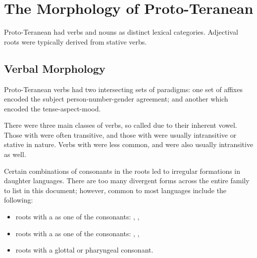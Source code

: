 \documentclass[grammar]{subfiles}
\begin{document}


\section{The Morphology of Proto-Teranean}
\label{sec:history:proto_teranean:morphology}

Proto-Teranean had verbs and nouns as distinct lexical categories.  Adjectival
roots were typically derived from stative verbs.


\subsection{Verbal Morphology}
\label{ssec:history:pt:verbal_morphology}

Proto-Teranean verbs had two intersecting sets of paradigms: one set of affixes
encoded the subject person-number-gender agreement; and another which encoded
the tense-aspect-mood.  

There were three main classes of verbs, so called due to their inherent vowel.
Those with  were often transitive, and those with  were
usually intransitive or stative in nature.  Verbs with  were less
common, and were also usually intransitive as well.

Certain combinations of consonants in the roots led to irregular formations in
daughter languages.  There are too many divergent forms across the entire
family to list in this document; however, common to most languages include the
following:

\begin{itemize}
  \item roots with a  as one of the consonants: ,
    , 
  \item roots with a  as one of the consonants: ,
    , 
  \item roots with a glottal or pharyngeal consonant.
\end{itemize}
\end{document}
